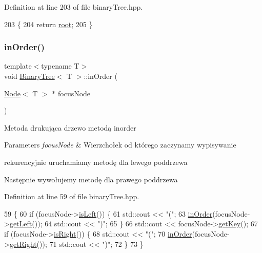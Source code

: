 Definition at line 203 of file binary\+Tree.\+hpp.


\begin{DoxyCode}
203                            \{
204             \textcolor{keywordflow}{return} \hyperlink{classBinaryTree_a2db40f59d96afceb1a005e6d9aef2374}{root};
205         \}
\end{DoxyCode}
\mbox{\label{classBinaryTree_a547a4d22eb7a8f18ca09dd77402d88c6}} 
\subsubsection{\texorpdfstring{in\+Order()}{inOrder()}}
{\footnotesize\ttfamily template$<$typename T$>$ \\
void \hyperlink{classBinaryTree}{Binary\+Tree}$<$ T $>$\+::in\+Order (\begin{DoxyParamCaption}\item[{\hyperlink{classNode}{Node}$<$ T $>$ $\ast$}]{focus\+Node }\end{DoxyParamCaption})\hspace{0.3cm}{\ttfamily [inline]}}

Metoda drukująca drzewo metodą inorder 
\begin{DoxyParams}{Parameters}
{\em focus\+Node} & Wierzchołek od którego zaczynamy wypisywanie \\
\hline
\end{DoxyParams}
rekurencyjnie uruchamiamy metodę dla lewego poddrzewa

Następnie wywołujemy metodę dla prawego poddrzewa 

Definition at line 59 of file binary\+Tree.\+hpp.


\begin{DoxyCode}
59                                          \{
60            \textcolor{keywordflow}{if} (focusNode->\hyperlink{classNode_a906ae0e0b015275eacf168ef55017f7f}{isLeft}()) \{
61                std::cout << \textcolor{stringliteral}{"("};
63                \hyperlink{classBinaryTree_a547a4d22eb7a8f18ca09dd77402d88c6}{inOrder}(focusNode->\hyperlink{classNode_a1c884e62ef0a9b5dd4f35dbea09145f2}{getLeft}());
64                std::cout << \textcolor{stringliteral}{")"};
65            \}
66            std::cout << focusNode->\hyperlink{classNode_a3c04afa4e4c8e555cc87a22757ab5f6a}{getKey}();
67            \textcolor{keywordflow}{if} (focusNode->\hyperlink{classNode_a983178a46cc464ca0738ee8c7d8b2cc4}{isRight}()) \{
68                std::cout << \textcolor{stringliteral}{"("};
70                \hyperlink{classBinaryTree_a547a4d22eb7a8f18ca09dd77402d88c6}{inOrder}(focusNode->\hyperlink{classNode_af9078f2651b16fc1a3502d7927761df1}{getRight}());
71                std::cout << \textcolor{stringliteral}{")"};
72            \}
73         \}
\end{DoxyCode}
\mbox{\label{classBinaryTree_a86fedb07a87af1b02e3408950c4f9663}} 
